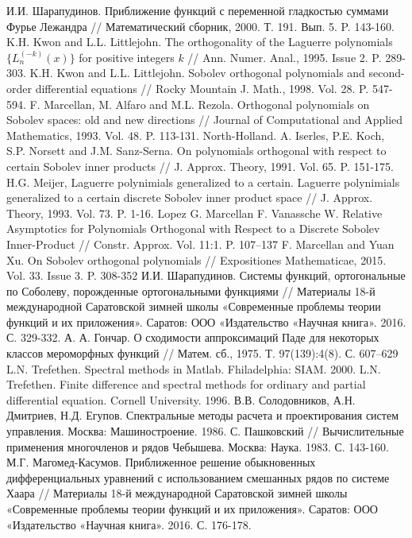 \begin{thebibliography}{1}
 И.И. Шарапудинов. Приближение функций с переменной гладкостью суммами Фурье Лежандра // Математический сборник, 2000. Т. 191. Вып. 5. P. 143-160.
 K.H. Kwon and L.L. Littlejohn. The orthogonality of the Laguerre polynomials $\{L_n^{(-k)}(x)\}$ for positive integers $k$ // Ann. Numer. Anal., 1995. Issue 2. P. 289-303.
 K.H. Kwon and L.L. Littlejohn. Sobolev orthogonal polynomials and second-order differential equations // Rocky Mountain J. Math., 1998. Vol. 28. P. 547-594.
 F. Marcellan, M. Alfaro and M.L. Rezola. Orthogonal polynomials on Sobolev spaces: old and new directions // Journal of Computational and Applied Mathematics, 1993. Vol. 48. P. 113-131. North-Holland.
 A. Iserles, P.E. Koch, S.P. Norsett and J.M. Sanz-Serna. On polynomials  orthogonal  with respect  to certain Sobolev inner products // J. Approx. Theory, 1991. Vol. 65. P. 151-175.
 H.G. Meijer, Laguerre polynimials generalized to a certain.  Laguerre polynimials generalized to a certain discrete Sobolev inner product space // J. Approx. Theory, 1993. Vol. 73. P. 1-16.
 Lopez G. Marcellan F. Vanassche W. Relative Asymptotics for Polynomials Orthogonal with Respect to a Discrete Sobolev Inner-Product // Constr. Approx. Vol. 11:1. P. 107–137
F. Marcellan and Yuan Xu. On Sobolev orthogonal polynomials // Expositiones Mathematicae, 2015. Vol. 33. Issue 3. P. 308-352
 И.И. Шарапудинов. Системы функций, ортогональные по Соболеву, порожденные ортогональными функциями // Материалы 18-й международной Саратовской зимней школы «Современные проблемы теории функций и их приложения». Саратов: ООО «Издательство «Научная книга». 2016. С. 329-332.
 А. А. Гончар. О сходимости аппроксимаций Паде для некоторых классов мероморфных функций // Матем. сб., 1975. Т. 97(139):4(8). С. 607–629
 L.N. Trefethen. Spectral methods in Matlab. Fhiladelphia: SIAM. 2000.
 L.N. Trefethen. Finite difference and spectral methods for ordinary and partial differential equation. Cornell University. 1996.
 В.В. Солодовников, А.Н. Дмитриев, Н.Д. Егупов. Спектральные методы расчета и проектирования систем управления. Москва: Машиностроение. 1986.
 С. Пашковский // Вычислительные применения многочленов и рядов Чебышева. Москва: Наука. 1983. С. 143-160.
 М.Г. Магомед-Касумов. Приближенное решение обыкновенных дифференциальных уравнений с использованием смешанных рядов по системе Хаара // Материалы 18-й международной Саратовской зимней школы «Современные проблемы теории функций и их приложения». Саратов: ООО «Издательство «Научная книга». 2016. С. 176-178.

\end{thebibliography}
